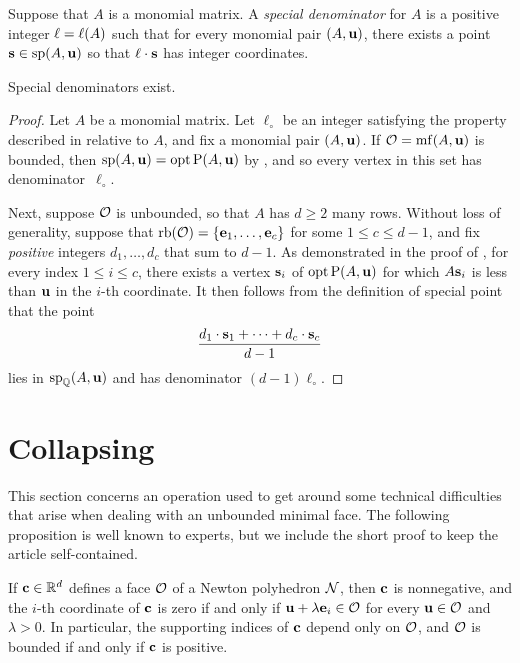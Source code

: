 \documentclass[11pt]{amsart}
\begin{document}
\begin{definition}  Suppose that $A$ is a monomial matrix. A \emph{special denominator} for $A$ is a positive integer $\ell = \ell(A)$ such that for every monomial pair $(A, \mathbf{u})$, there exists a point $\mathbf{s} \in \operatorname{sp}(A, \mathbf{u})$ so that $\ell \cdot \mathbf{s}$ has integer coordinates.
\end{definition}

\begin{theorem}  
\label{special-denominators-exist:  T}
Special denominators exist.
\end{theorem}

\begin{proof}
   Let $A$ be a monomial matrix.
   Let $\ell_{\circ}$ be an integer satisfying the property described in  relative to $A$, and fix a monomial pair $(A, \mathbf{u})$.
   If $\mathcal{O} = \operatorname{mf}(A, \mathbf{u})$ is bounded, then $\operatorname{sp}(A, \mathbf{u}) = \operatorname{opt} \mathrm{P}(A, \mathbf{u})$ by , and so every vertex in this set has denominator~$\ell_{\circ}$.

   Next, suppose $\mathcal{O}$ is unbounded, so that $A$ has $d \geq 2$ many rows.
   Without loss of generality, suppose that $\operatorname{rb}(\mathcal{O}) = \{ \mathbf{e}_1, \ldots, \mathbf{e}_c \}$ for some $1 \leq c \leq d-1$, and fix \emph{positive} integers $d_1, \ldots, d_c$ that sum to $d-1$.
   As demonstrated in the  proof of , for every index  $1 \leq i \leq c$, there exists a vertex $\mathbf{s}_i$ of $\operatorname{opt} \mathrm{P}(A, \mathbf{u})$ for which $A \mathbf{s}_i$ is less than $\mathbf{u}$ in the $i$-th coordinate.
   It then follows from the definition of special point that the point
   \[ \frac{ d_1 \cdot \mathbf{s}_1 + \cdots + d_c \cdot  \mathbf{s}_c}{d-1}  \]
   lies in $\operatorname{sp}_{\mathbb{Q}}(A, \mathbf{u})$ and has denominator $(d-1)\ell_{\circ}$.  
\end{proof}

\newpage
\section{Collapsing}

This section concerns an operation used to get around some technical difficulties that arise when dealing with an unbounded minimal face.
The following proposition is well known to experts, but we include the short proof to keep the article self-contained.

\begin{proposition} 
   \label{face: P}
   If $\mathbf{c} \in \mathbb{R}^d$ defines a face $\mathcal{O}$ of a Newton polyhedron $\mathcal{N}$, then $\mathbf{c}$ is nonnegative, and the $i$-th coordinate of $\mathbf{c}$ is zero if and only if $\mathbf{u} + \lambda \mathbf{e}_i \in \mathcal{O}$  for every $\mathbf{u} \in \mathcal{O}$ and $\lambda > 0$.
   In particular, the supporting indices of $\mathbf{c}$ depend only on $\mathcal{O}$, and $\mathcal{O}$ is bounded if and only if $\mathbf{c}$ is positive. 
\end{proposition}
\end{document}
